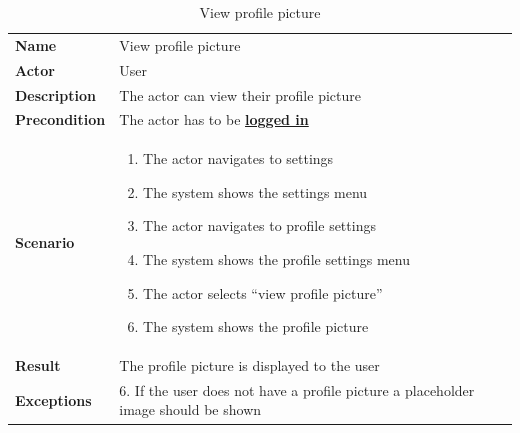 \begin{table}[ht]
    \caption{View profile picture}
    \begin{tabular}{|L{5cm}|L{10cm}|}
        \toprule
        \textbf{Name}         & View profile picture                                          \\
        \textbf{Actor}        & User                                                          \\
        \textbf{Description}  & The actor can view their profile picture                      \\
        \textbf{Precondition} & The actor has to be \textbf{\hyperref[tab:table8]{logged in}} \\
        \textbf{Scenario} &
        \vspace{-0.75cm}
        \begin{enumerate}
            \setlength\itemsep{-0.5em}
            \item The actor navigates to settings
            \item The system shows the settings menu
            \item The actor navigates to profile settings
            \item The system shows the profile settings menu
            \item The actor selects \enquote{view profile picture}
            \item The system shows the profile picture
        \end{enumerate} \\[-0.5cm]
        \textbf{Result}       & The profile picture is displayed to the user                  \\
        \textbf{Exceptions} & 6.
        If the user does not have a profile picture a placeholder image should be shown \\
        \bottomrule
    \end{tabular}
    \label{tab:table15}
\end{table}

